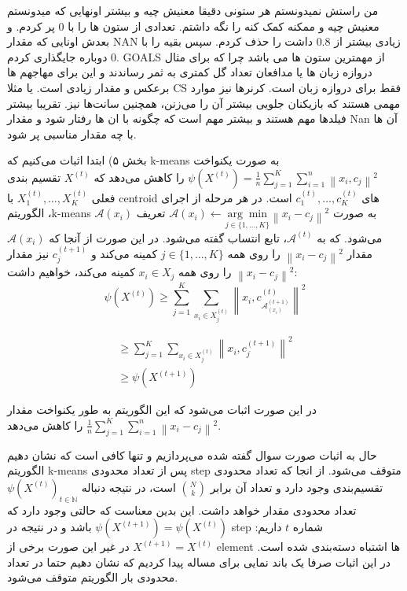 \begin{prob}

\end{prob}

\begin{sol}


من راستش نمیدونستم هر ستونی دقیقا معنیش چیه و بیشتر اونهایی که میدونستم معنیش چیه و ممکنه کمک کنه را نگه داشتم.
تعدادی از ستون ها را با 0  پر کردم. و بعدش اونایی که مقدار NAN زیادی بیشتر از 0.8 داشت را حذف کردم.  سپس بقیه را با 0  دوباره جایگذاری کردم. 
GOALS از مهمترین ستون ها می باشد چرا که برای مثال دروازه زبان ها یا مدافعان تعداد گل کمتری به ثمر رساندند و این برای مهاجهم ها برعکس و مقدار زیادی است.
یا مثلا CS فقط برای دروازه زبان است. کرنرها نیز موارد مهمی هستند که بازیکنان جلویی بیشتر آن را می‌زنن، همچنین سانت‌ها نیز. تقریبا بیشتر فیلدها مهم هستند و بیشتر مهم است که چگونه با ان ها رفتار شود و مقدار Nan آن ها با چه مقدار مناسبی پر شود.


بخش ۵)
ابتدا اثبات می‌کنیم که k-means به صورت یکنواخت  
 $\psi\left(X^{(t)}\right)=\frac{1}{n} \sum_{j=1}^{K} \sum_{i=1}^{n}\left\|x_{i}, c_{j}\right\|^{2}$
را کاهش می‌دهد که  
 $X^{(t)}$ 
تقسیم بندی فعلی 
 $X_{1}^{(t)}, \ldots, X_{K}^{(t)}$ 
با
centroid 
های 
$c_{1}^{(t)}, \ldots, c_{K}^{(t)}$ 
است.
در هر مرحله از اجرای الگوریتم ،k-means $\mathcal{A}\left(x_{i}\right)$ به صورت
$
\mathcal{A}\left(x_{i}\right) \longleftarrow \underset{j \in\{1, \ldots, K\}}{\arg \min }\left\|x_{i}-c_{j}\right\|^{2}$
تعریف می‌شود.
که به $\mathcal{A}^{(t)}$، تابع انتساب گفته می‌شود.
در این صورت از آنجا که $\mathcal{A}\left(x_{i}\right)$ مقدار $\left\|x_{i}-c_{j}\right\|^{2}$ را روی همه $j \in\{1, \ldots, K\}$ کمینه می‌کند و $c_{j}^{(t+1)}$  نیز مقدار $\left\|x_{i}-c_{j}\right\|^{2}$ را روی همه $x_{i} \in X_{j}$ کمینه می‌کند، خواهیم داشت:
$$
\psi\left(X^{(t)}\right) \geqslant \sum_{j=1}^{K} \sum_{x_{i} \in X_{j}^{(t)}}\left\|x_{i}, c_{\mathcal{A}_{\left(x_{i}\right)}^{(t+1)}}^{(t)}\right\|^{2}
$$

$$
\begin{array}{l}
\geqslant \sum_{j=1}^{K} \sum_{x_{i} \in X_{j}^{(t)}}\left\|x_{i}, c_{j}^{(t+1)}\right\|^{2} \\
\geqslant \psi\left(X^{(t+1)}\right)
\end{array}
$$

در این صورت اثبات می‌شود که این الگوریتم به طور یکنواخت مقدار
$\frac{1}{n} \sum_{j=1}^{K} \sum_{i=1}^{n}\left\|x_{i}-c_{j}\right\|^{2}$
را کاهش می‌دهد.

حال به اثبات صورت سوال گفته شده می‌پردازیم و تنها کافی است که نشان دهیم الگوریتم k-means پس از تعداد محدودی step متوقف می‌شود.
از انجا که تعداد محدودی تقسیم‌بندی وجود دارد و تعداد آن برابر
$ {N\choose k}$ 
است، در نتیجه دنباله 
$\psi\left(X^{(t)}\right)_{t \in \mathbb{N}}$
تعداد محدودی مقدار خواهد داشت. این بدین معناست که حالتی وجود دارد که  $\psi\left(X^{(t+1)}\right)=\psi\left(X^{(t)}\right)$
باشد و در نتیجه 
در step شماره $t$
‌داریم:
$X^{(t+1)}=X^{(t)}$
در غیر این صورت برخی از element ها اشتباه دسته‌بندی شده است.
در این اثبات صرفا یک باند نمایی برای مساله پیدا کردیم که نشان دهیم حتما در تعداد محدودی بار الگوریتم متوقف می‌شود.


\end{sol}
